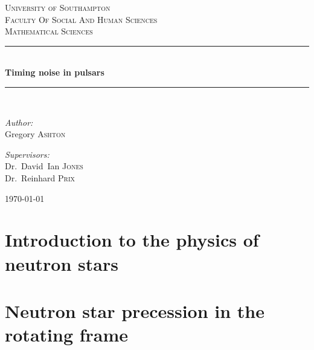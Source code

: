 \documentclass[twoside]{thesis}
\begin{document}
\def\biblio{}

\begin{titlepage}
\newcommand{\HRule}{\rule{\linewidth}{0.5mm}}
\begin{center}

\textsc{\LARGE University of Southampton}\\[0.2cm]
\textsc{\Large Faculty Of Social And Human Sciences}\\[0.2cm]
\textsc{\Large Mathematical Sciences}\\[1.5cm]

\HRule \\[0.4cm]
{ \huge \bfseries Timing noise in pulsars \\[0.4cm] }

\HRule \\[1.5cm]

\noindent
\begin{minipage}{0.4\textwidth}
\begin{flushleft} \large
\emph{Author:}\\
Gregory \textsc{Ashton}
\end{flushleft}
\end{minipage}%
\begin{minipage}{0.4\textwidth}
\begin{flushright} \large
\emph{Supervisors:} \\
Dr.~David~Ian \textsc{Jones} \\
Dr.~Reinhard \textsc{Prix}
\end{flushright}
\end{minipage}

\vfill

{\large \today}
\end{center}
\end{titlepage}

\tableofcontents

\chapter{Introduction to the physics of neutron stars}
\label{sec: neutron star physics}


\chapter{Neutron star precession in the rotating frame}
\label{sec: rotating frame}

\end{document}
